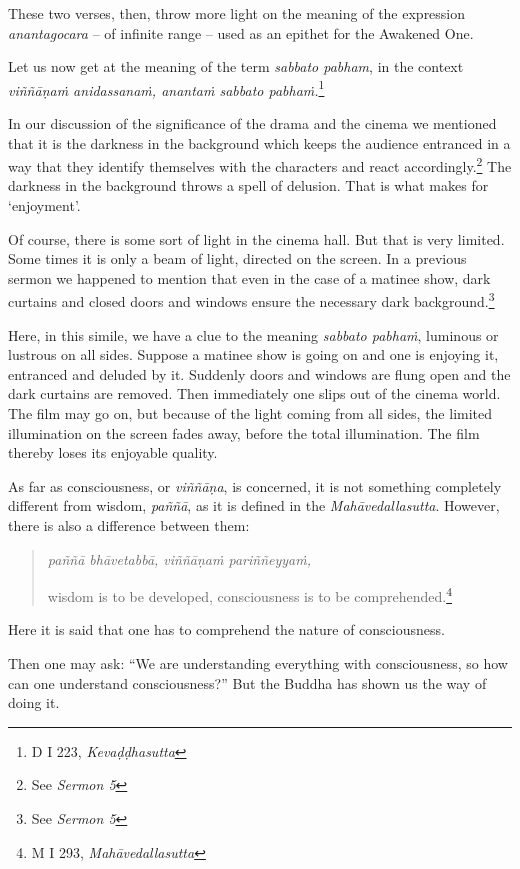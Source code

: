 These two verses, then, throw more light on the meaning of the expression \emph{anantagocara} -- of infinite range -- used as an epithet for the Awakened One.

Let us now get at the meaning of the term \emph{sabbato pabham}, in the context \emph{viññāṇaṁ anidassanaṁ, anantaṁ sabbato pabhaṁ.}\footnote{D I 223, \emph{Kevaḍḍhasutta}}

In our discussion of the significance of the drama and the cinema we mentioned that it is the darkness in the background which keeps the audience entranced in a way that they identify themselves with the characters and react accordingly.\footnote{See \emph{Sermon 5}} The darkness in the background throws a spell of delusion. That is what makes for `enjoyment'.

Of course, there is some sort of light in the cinema hall. But that is very limited. Some times it is only a beam of light, directed on the screen. In a previous sermon we happened to mention that even in the case of a matinee show, dark curtains and closed doors and windows ensure the necessary dark background.\footnote{See \emph{Sermon 5}}

Here, in this simile, we have a clue to the meaning \emph{sabbato pabhaṁ}, luminous or lustrous on all sides. Suppose a matinee show is going on and one is enjoying it, entranced and deluded by it. Suddenly doors and windows are flung open and the dark curtains are removed. Then immediately one slips out of the cinema world. The film may go on, but because of the light coming from all sides, the limited illumination on the screen fades away, before the total illumination. The film thereby loses its enjoyable quality.

As far as consciousness, or \emph{viññāṇa}, is concerned, it is not something completely different from wisdom, \emph{paññā}, as it is defined in the \emph{Mahāvedallasutta}. However, there is also a difference between them:

\begin{quote}
\emph{paññā bhāvetabbā, viññāṇaṁ pariññeyyaṁ,}

wisdom is to be developed, consciousness is to be comprehended.\footnote{M I 293, \emph{Mahāvedallasutta}}
\end{quote}

Here it is said that one has to comprehend the nature of consciousness.

Then one may ask: ``We are understanding everything with consciousness, so how can one understand consciousness?'' But the Buddha has shown us the way of doing it.

